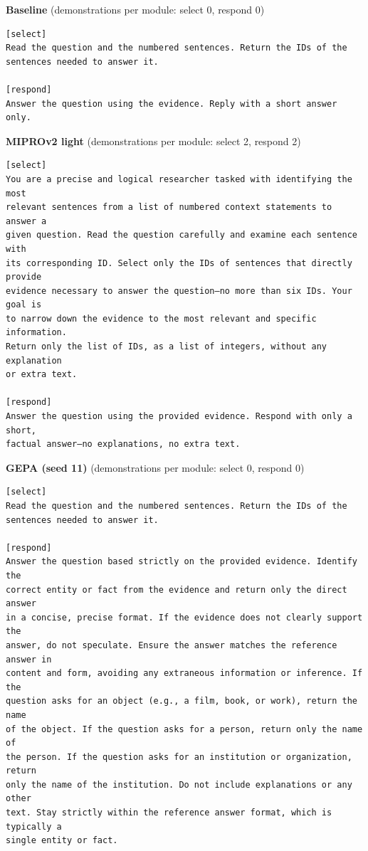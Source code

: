\textbf{Baseline} (demonstrations per module: select 0, respond 0)
\begin{verbatim}
[select]
Read the question and the numbered sentences. Return the IDs of the
sentences needed to answer it.

[respond]
Answer the question using the evidence. Reply with a short answer only.

\end{verbatim}
\textbf{MIPROv2 light} (demonstrations per module: select 2, respond 2)
\begin{verbatim}
[select]
You are a precise and logical researcher tasked with identifying the most
relevant sentences from a list of numbered context statements to answer a
given question. Read the question carefully and examine each sentence with
its corresponding ID. Select only the IDs of sentences that directly provide
evidence necessary to answer the question—no more than six IDs. Your goal is
to narrow down the evidence to the most relevant and specific information.
Return only the list of IDs, as a list of integers, without any explanation
or extra text.

[respond]
Answer the question using the provided evidence. Respond with only a short,
factual answer—no explanations, no extra text.

\end{verbatim}
\textbf{GEPA (seed 11)} (demonstrations per module: select 0, respond 0)
\begin{verbatim}
[select]
Read the question and the numbered sentences. Return the IDs of the
sentences needed to answer it.

[respond]
Answer the question based strictly on the provided evidence. Identify the
correct entity or fact from the evidence and return only the direct answer
in a concise, precise format. If the evidence does not clearly support the
answer, do not speculate. Ensure the answer matches the reference answer in
content and form, avoiding any extraneous information or inference. If the
question asks for an object (e.g., a film, book, or work), return the name
of the object. If the question asks for a person, return only the name of
the person. If the question asks for an institution or organization, return
only the name of the institution. Do not include explanations or any other
text. Stay strictly within the reference answer format, which is typically a
single entity or fact.

\end{verbatim}
